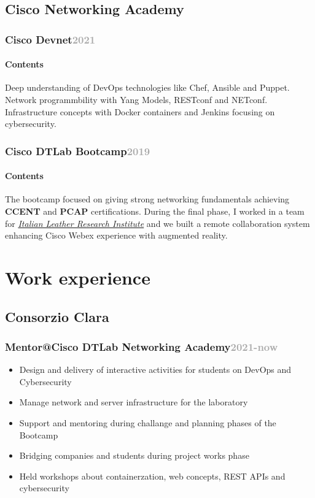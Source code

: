 \documentclass[11pt,a4paper]{article}
\begin{document}
  \subsection{Cisco Networking Academy}
  \subsubsection{Cisco Devnet\hfill \textcolor{darkgray}{\small{2021}}} 
  \paragraph{Contents}Deep understanding of DevOps technologies like Chef, Ansible and Puppet. Network programmbility with Yang Models, RESTconf and NETconf. Infrastructure concepts with Docker containers and Jenkins focusing on cybersecurity.
  \subsubsection{Cisco DTLab Bootcamp\hfill \textcolor{darkgray}{\small{2019}}} 
  \paragraph{Contents} The bootcamp focused on giving strong networking fundamentals achieving \textbf{CCENT} and \textbf{PCAP} certifications. During the final phase, I worked in a team for \href{https://ssip.it/}{\textit{Italian Leather Research Institute}} and we built a remote collaboration system enhancing Cisco Webex experience with augmented reality.

  \section*{Work experience}
  \subsection{Consorzio Clara}
  \subsubsection{Mentor@Cisco DTLab Networking Academy\hfill \textcolor{darkgray}{\small{2021-now}}}

  \begin{itemize}
    \item Design and delivery of interactive activities for students on DevOps and Cybersecurity
    \item Manage network and server infrastructure for the laboratory
    \item Support and mentoring during challange and planning phases of the Bootcamp
    \item Bridging companies and students during project works phase
    \item Held workshops about containerzation, web concepts, REST APIs and cybersecurity 
  \end{itemize}
\end{document}
